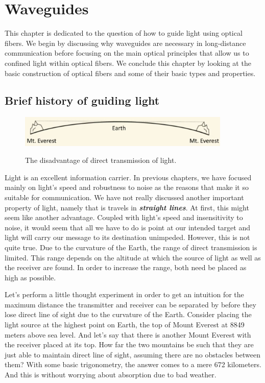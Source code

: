 \chapter{Waveguides}
\label{sec:7_waveguides}

This chapter is dedicated to the question of how to guide light using optical fibers.
We begin by discussing why waveguides are necessary in long-distance communication before focusing on the main optical principles that allow us to confined light within optical fibers.
We conclude this chapter by looking at the basic construction of optical fibers and some of their basic types and properties.

\section{Brief history of guiding light}
\label{sec:7-1_history}

\begin{figure}[H]
    \centering
    \includegraphics[width=0.9\textwidth]{lesson7/everest.pdf}
    \label{図: 1}
    \caption{The disadvantage of direct transmission of light.}
\end{figure}

Light is an excellent information carrier.
In previous chapters, we have focused mainly on light's speed and robustness to noise as the reasons that make it so suitable for communication.
We have not really discussed another important property of light, namely that is travels in \textit{\textbf{straight lines}}.
At first, this might seem like another advantage.
Coupled with light's speed and insensitivity to noise, it would seem that all we have to do is point at our intended target and light will carry our message to its destination unimpeded.
However, this is not quite true.
Due to the curvature of the Earth, the range of direct transmission is limited.
This range depends on the altitude at which the source of light as well as the receiver are found.
In order to increase the range, both need be placed as high as possible.

Let's perform a little thought experiment in order to get an intuition for the maximum distance the transmitter and receiver can be separated by before they lose direct line of sight due to the curvature of the Earth.
Consider placing the light source at the highest point on Earth, the top of Mount Everest at 8849 meters above sea level.
And let's say that there is another Mount Everest with the receiver placed at its top.
How far the two mountains be such that they are just able to maintain direct line of sight, assuming there are no obstacles between them?
With some basic trigonometry, the answer comes to a mere 672 kilometers.
And this is without worrying about absorption due to bad weather.

